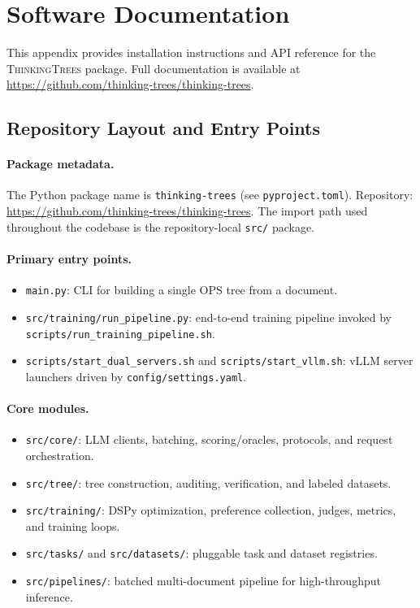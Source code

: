 \section{Software Documentation}\label{app:software}

This appendix provides installation instructions and API reference for the \textsc{ThinkingTrees} package. Full documentation is available at \url{https://github.com/thinking-trees/thinking-trees}.

\subsection{Repository Layout and Entry Points}

\paragraph{Package metadata.}
The Python package name is \texttt{thinking-trees} (see \texttt{pyproject.toml}).
Repository: \url{https://github.com/thinking-trees/thinking-trees}.
The import path used throughout the codebase is the repository-local \texttt{src/} package.

\paragraph{Primary entry points.}
\begin{itemize}[nosep]
    \item \texttt{main.py}: CLI for building a single OPS tree from a document.
    \item \texttt{src/training/run\_pipeline.py}: end-to-end training pipeline invoked by \texttt{scripts/run\_training\_pipeline.sh}.
    \item \texttt{scripts/start\_dual\_servers.sh} and \texttt{scripts/start\_vllm.sh}: vLLM server launchers driven by \texttt{config/settings.yaml}.
\end{itemize}

\paragraph{Core modules.}
\begin{itemize}[nosep]
    \item \texttt{src/core/}: LLM clients, batching, scoring/oracles, protocols, and request orchestration.
    \item \texttt{src/tree/}: tree construction, auditing, verification, and labeled datasets.
    \item \texttt{src/training/}: DSPy optimization, preference collection, judges, metrics, and training loops.
    \item \texttt{src/tasks/} and \texttt{src/datasets/}: pluggable task and dataset registries.
    \item \texttt{src/pipelines/}: batched multi-document pipeline for high-throughput inference.
\end{itemize}

